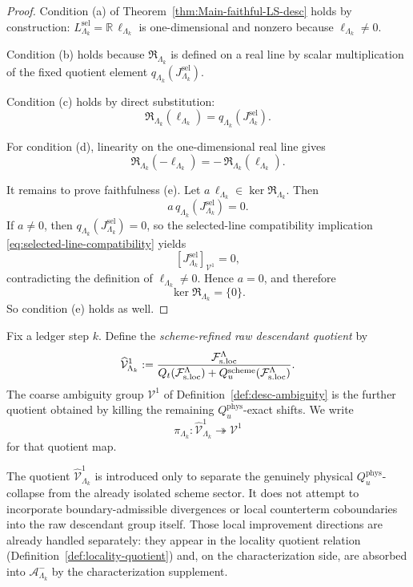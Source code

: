 \begin{proof}
Condition \textnormal{(a)} of Theorem~\ref{thm:Main-faithful-LS-desc} holds by construction:
\(
L^{\mathrm{sel}}_{\Lambda_k}=\mathbb R\,\ell_{\Lambda_k}
\)
is one-dimensional and nonzero because
\(
\ell_{\Lambda_k}\neq 0
\).

Condition \textnormal{(b)} holds because \(\mathfrak R_{\Lambda_k}\) is defined on a real line by
scalar multiplication of the fixed quotient element \(q_{\Lambda_k}(J^{\mathrm{sel}}_{\Lambda_k})\).

Condition \textnormal{(c)} holds by direct substitution:
\[
\mathfrak R_{\Lambda_k}(\ell_{\Lambda_k})
=
q_{\Lambda_k}(J^{\mathrm{sel}}_{\Lambda_k}).
\]

For condition \textnormal{(d)}, linearity on the one-dimensional real line gives
\[
\mathfrak R_{\Lambda_k}(-\ell_{\Lambda_k})
=
-\,\mathfrak R_{\Lambda_k}(\ell_{\Lambda_k}).
\]

It remains to prove faithfulness \textnormal{(e)}.
Let \(a\,\ell_{\Lambda_k}\in\ker\mathfrak R_{\Lambda_k}\).
Then
\[
a\,q_{\Lambda_k}(J^{\mathrm{sel}}_{\Lambda_k})=0.
\]
If \(a\neq 0\), then
\(
q_{\Lambda_k}(J^{\mathrm{sel}}_{\Lambda_k})=0
\),
so the selected-line compatibility implication
\eqref{eq:selected-line-compatibility} yields
\[
[J^{\mathrm{sel}}_{\Lambda_k}]_{\mathcal V^1}=0,
\]
contradicting the definition of \(\ell_{\Lambda_k}\neq 0\).
Hence \(a=0\), and therefore
\[
\ker\mathfrak R_{\Lambda_k}=\{0\}.
\]
So condition \textnormal{(e)} holds as well.
\end{proof}

\begin{definition}
\label{def:Main-Vhat}
Fix a ledger step \(k\).
Define the \emph{scheme-refined raw descendant quotient} by
\[
\widehat{\mathcal V}^1_{\Lambda_k}
:=
\frac{\mathcal F_{\mathrm{s.loc}}^\Lambda}{Q_t(\mathcal F_{\mathrm{s.loc}}^\Lambda)+Q_u^{\mathrm{scheme}}(\mathcal F_{\mathrm{s.loc}}^\Lambda)}.
\]
The coarse ambiguity group \(\mathcal V^1\) of
Definition~\ref{def:desc-ambiguity} is the further quotient obtained by killing the
remaining \(Q_u^{\mathrm{phys}}\)-exact shifts.  We write
\[
\pi_{\Lambda_k}:\widehat{\mathcal V}^1_{\Lambda_k}\twoheadrightarrow \mathcal V^1
\]
for that quotient map.
\end{definition}

\begin{remark}
\label{rem:Main-Vhat-scope}
The quotient \(\widehat{\mathcal V}^1_{\Lambda_k}\) is introduced only to separate the genuinely
physical \(Q_u^{\mathrm{phys}}\)-collapse from the already isolated scheme sector.
It does not attempt to incorporate boundary-admissible divergences or local counterterm
coboundaries into the raw descendant group itself.
Those local improvement directions are already handled separately:
they appear in the locality quotient relation
\textnormal{(Definition~\ref{def:locality-quotient})} and, on the characterization side, are
absorbed into \(\mathcal A^-_{\Lambda_k}\) by the characterization supplement.
\end{remark}

